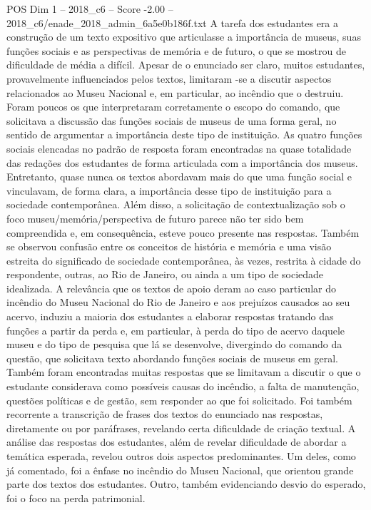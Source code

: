 \begin{textsample}{POS Dim 1 – 2018\_c6 – Score -2.00 – 2018\_c6/enade\_2018\_admin\_6a5e0b186f.txt}
A tarefa dos estudantes era a construção de um texto expositivo que articulasse a importância de museus, suas funções sociais e as perspectivas de memória e de futuro, o que se mostrou de dificuldade de média a difícil.
Apesar de o enunciado ser claro, muitos estudantes, provavelmente influenciados pelos textos, limitaram -se a discutir aspectos relacionados ao Museu Nacional e, em particular, ao incêndio que o destruiu.
Foram poucos os que interpretaram corretamente o escopo do comando, que solicitava a discussão das funções sociais de museus de uma forma geral, no sentido de argumentar a importância deste tipo de instituição.
As quatro funções sociais elencadas no padrão de resposta foram encontradas na quase totalidade das redações dos estudantes de forma articulada com a importância dos museus.
Entretanto, quase nunca os textos abordavam mais do que uma função social e vinculavam, de forma clara, a importância desse tipo de instituição para a sociedade contemporânea.
Além disso, a solicitação de contextualização sob o foco museu/memória/perspectiva de futuro parece não ter sido bem compreendida e, em consequência, esteve pouco presente nas respostas.
Também se observou confusão entre os conceitos de história e memória e uma visão estreita do significado de sociedade contemporânea, às vezes, restrita à cidade do respondente, outras, ao Rio de Janeiro, ou ainda a um tipo de sociedade idealizada.
A relevância que os textos de apoio deram ao caso particular do incêndio do Museu Nacional do Rio de Janeiro e aos prejuízos causados ao seu acervo, induziu a maioria dos estudantes a elaborar respostas tratando das funções a partir da perda e, em particular, à perda do tipo de acervo daquele museu e do tipo de pesquisa que lá se desenvolve, divergindo do comando da questão, que solicitava texto abordando funções sociais de museus em geral.
Também foram encontradas muitas respostas que se limitavam a discutir o que o estudante considerava como possíveis causas do incêndio, a falta de manutenção, questões políticas e de gestão, sem responder ao que foi solicitado.
Foi também recorrente a transcrição de frases dos textos do enunciado nas respostas, diretamente ou por paráfrases, revelando certa dificuldade de criação textual.
A análise das respostas dos estudantes, além de revelar dificuldade de abordar a temática esperada, revelou outros dois aspectos predominantes.
Um deles, como já comentado, foi a ênfase no incêndio do Museu Nacional, que orientou grande parte dos textos dos estudantes.
Outro, também evidenciando desvio do esperado, foi o foco na perda patrimonial.

\end{textsample}

